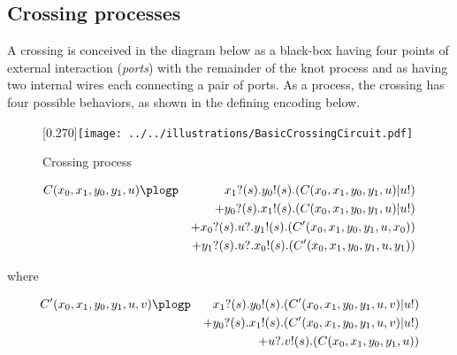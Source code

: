 \subsection{Crossing processes}\label{sub:crossing_processes} %
A crossing is conceived in the diagram below as a black-box having
four points of external interaction (\emph{ports}) with the remainder
of the knot process and as having two internal wires each connecting a
pair of ports. As a process, the crossing has four possible behaviors,
as shown in the defining encoding below.
\begin{figure}[hbp]
    \centering
    \scalebox{0.27}[0.270]{\texttt{[image: ../../illustrations/BasicCrossingCircuit.pdf]}}
    \caption{ Crossing process }
\end{figure}

\begin{eqnarray*}
   C(x_0,x_1,y_0,y_1,u) & \plogp   & x_1?(s).y_0!(s).(C(x_0,x_1,y_0,y_1,u)|u!) \nonumber \\
  & & + y_0?(s).x_1!(s).(C(x_0,x_1,y_0,y_1,u)|u!) \nonumber \\
  & & + x_0?(s).u?.y_1!(s).(C'(x_0,x_1,y_0,y_1,u,x_0)) \nonumber \\
  & & + y_1?(s).u?.x_0!(s).(C'(x_0,x_1,y_0,y_1,u,y_1)) \nonumber
\end{eqnarray*}

where

\begin{eqnarray*}
   C'(x_0,x_1,y_0,y_1,u,v) & \plogp   & x_1?(s).y_0!(s).(C'(x_0,x_1,y_0,y_1,u,v)|u!) \nonumber \\
  & & + y_0?(s).x_1!(s).(C'(x_0,x_1,y_0,y_1,u,v)|u!) \nonumber \\
  & & + u?.v!(s).(C(x_0, x_1, y_0, y_1, u)) \nonumber
\end{eqnarray*}

